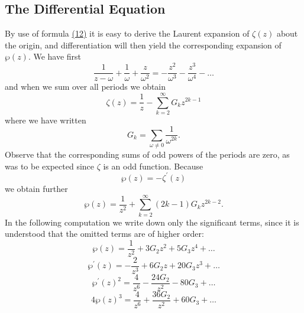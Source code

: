 \setcounter{section}{3}\setcounter{subsection}{2}\subsection{The Differential Equation}\label{sec:7.3.3}
By use of formula \hyperref[eq:7.12]{(12)} it is easy to derive the Laurent expansion of $\zeta(z)$ about the origin, and differentiation will then yield the corresponding expansion of $\wp(z)$. We have first
\begin{equation*}
\frac {1}{z - \omega} + \frac {1}{\omega} + \frac {z}{\omega^ {2}} = - \frac {z ^ {2}}{\omega^ {3}} - \frac {z ^ {3}}{\omega^ {4}} - \dots
\end{equation*}
and when we sum over all periods we obtain
\begin{equation*}
\zeta (z) = \frac {1}{z} - \sum_ {k = 2} ^ {\infty} G _ {k} z ^ {2 k - 1}
\end{equation*}
where we have written
\begin{equation*}
G _ {k} = \sum_ {\omega \neq 0} \frac {1}{\omega^ {2 k}}.
\end{equation*}
Observe that the corresponding sums of odd powers of the periods are zero, as was to be expected since $\zeta$ is an odd function. Because
\begin{equation*}
\wp (z) = - \zeta^ {\prime} (z)
\end{equation*}
we obtain further
\begin{equation*}
\wp (z) = \frac {1}{z ^ {2}} + \sum_ {k = 2} ^ {\infty} (2 k - 1) G _ {k} z ^ {2 k - 2}.
\end{equation*}
In the following computation we write down only the significant terms, since it is understood that the omitted terms are of higher order:
\begin{equation*}
\wp (z) = \frac {1}{z ^ {2}} + 3 G _ {2} z ^ {2} + 5 G _ {3} z ^ {4} + \dots
\end{equation*}
\begin{equation*}
\wp^ {\prime} (z) = - \frac {2}{z ^ {3}} + 6 G _ {2} z + 20 G _ {3} z ^ {3} + \dots
\end{equation*}
\begin{equation*}
\wp^ {\prime} (z) ^ {2} = \frac {4}{z ^ {6}} - \frac {24 G _ {2}}{z ^ {2}} - 80 G _ {3} + \dots
\end{equation*}
\begin{equation*}
4 \wp (z) ^ {3} = \frac {4}{z ^ {6}} + \frac {36 G _ {2}}{z ^ {2}} + 60 G _ {3} + \dots
\end{equation*}
